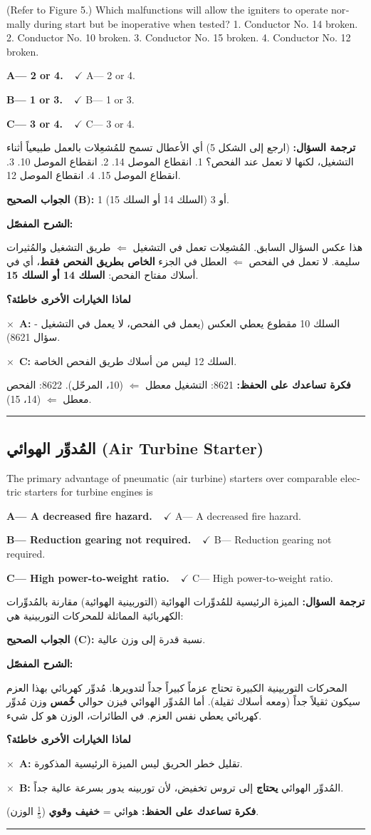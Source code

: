 \documentclass[11pt,a4paper]{article}
\newcommand{\en}[1]{\textenglish{#1}}
\newcommand{\correctletter}{}
\newcommand{\opt}[2]{%
  \ifdefstring{\correctletter}{#1}%
    {\textcolor{ansgreen}{\textbf{#1— #2\ \ $\checkmark$}}}%
    {#1— #2}\par}
\newcommand{\Q}[6]{%
  \renewcommand{\correctletter}{#6}%
  \par\bigskip
  \phantomsection\label{q#1}%
  \begin{tcolorbox}[enhanced,breakable,colback=qback,colframe=qframe,
      arc=2mm,boxrule=0.8pt,fonttitle=\bfseries,
      title={\en{Question #1}}]
    \begin{english}
      #2\par\smallskip
      \opt{A}{#3}\opt{B}{#4}\opt{C}{#5}
    \end{english}
  \end{tcolorbox}}
\newcommand{\tr}[1]{\textbf{\textcolor{qframe}{ترجمة السؤال:}} #1\par}
\newcommand{\ans}[2]{%
  \begin{tcolorbox}[colback=ansback,colframe=ansgreen,boxrule=0.6pt,arc=1.5mm,
      left=4pt,right=4pt,top=2pt,bottom=2pt]
    \textbf{\textcolor{ansgreen}{الجواب الصحيح (\en{#1}):}} #2
  \end{tcolorbox}}
\newcommand{\sharh}[1]{\textbf{\textcolor{conceptc}{الشرح المفصّل:}}\par #1\par}
\newcommand{\nohead}{\textbf{\textcolor{wrongc}{لماذا الخيارات الأخرى خاطئة؟}}\par}
\newcommand{\no}[2]{\hspace*{1em}\textcolor{wrongc}{$\times$}\ \textbf{\en{#1}:} #2\par}
\newcommand{\tip}[1]{%
  \begin{tcolorbox}[colback=tipback,colframe=tipframe,boxrule=0.5pt,arc=1.5mm,
      left=4pt,right=4pt,top=2pt,bottom=2pt]
    \textbf{فكرة تساعدك على الحفظ:} #1
  \end{tcolorbox}}
\newcommand{\qsep}{\par\medskip\noindent\textcolor{qframe!40}{\rule{\linewidth}{0.4pt}}\par}
\begin{document}
\Q{8622}{(Refer to Figure 5.) Which malfunctions will allow the igniters to operate normally during start but be inoperative when tested? 1. Conductor No. 14 broken. 2. Conductor No. 10 broken. 3. Conductor No. 15 broken. 4. Conductor No. 12 broken.}
{2 or 4.}
{1 or 3.}
{3 or 4.}{B}
\tr{(ارجع إلى الشكل 5) أي الأعطال تسمح للمُشعِلات بالعمل طبيعياً أثناء التشغيل، لكنها لا تعمل عند الفحص؟ 1. انقطاع الموصل 14. 2. انقطاع الموصل 10. 3. انقطاع الموصل 15. 4. انقطاع الموصل 12.}
\ans{B}{1 أو 3 (السلك 14 أو السلك 15).}
\sharh{هذا عكس السؤال السابق. المُشعِلات تعمل في التشغيل $\Leftarrow$ طريق التشغيل والمُثيرات سليمة. لا تعمل في الفحص $\Leftarrow$ العطل في الجزء \textbf{الخاص بطريق الفحص فقط}، أي في أسلاك مفتاح الفحص: \textbf{السلك 14 أو السلك 15}.}
\nohead
\no{A}{السلك 10 مقطوع يعطي العكس (يعمل في الفحص، لا يعمل في التشغيل - سؤال 8621).}
\no{C}{السلك 12 ليس من أسلاك طريق الفحص الخاصة.}
\tip{8621: التشغيل معطل $\Leftarrow$ (10، المرحّل). 8622: الفحص معطل $\Leftarrow$ (14، 15).}
\qsep

\subsection{المُدوِّر الهوائي (\en{Air Turbine Starter})}

\Q{8625}{The primary advantage of pneumatic (air turbine) starters over comparable electric starters for turbine engines is}
{A decreased fire hazard.}
{Reduction gearing not required.}
{High power-to-weight ratio.}{C}
\tr{الميزة الرئيسية للمُدوِّرات الهوائية (التوربينية الهوائية) مقارنة بالمُدوِّرات الكهربائية المماثلة للمحركات التوربينية هي:}
\ans{C}{نسبة قدرة إلى وزن عالية.}
\sharh{المحركات التوربينية الكبيرة تحتاج عزماً كبيراً جداً لتدويرها. مُدوِّر كهربائي بهذا العزم سيكون ثقيلاً جداً (ومعه أسلاك ثقيلة). أما المُدوِّر الهوائي فيزن حوالي \textbf{خُمس} وزن مُدوِّر كهربائي يعطي نفس العزم. في الطائرات، الوزن هو كل شيء.}
\nohead
\no{A}{تقليل خطر الحريق ليس الميزة الرئيسية المذكورة.}
\no{B}{المُدوِّر الهوائي \textbf{يحتاج} إلى تروس تخفيض، لأن توربينه يدور بسرعة عالية جداً.}
\tip{هوائي = \textbf{خفيف وقوي} ($\frac{1}{5}$ الوزن).}
\qsep
\end{document}
